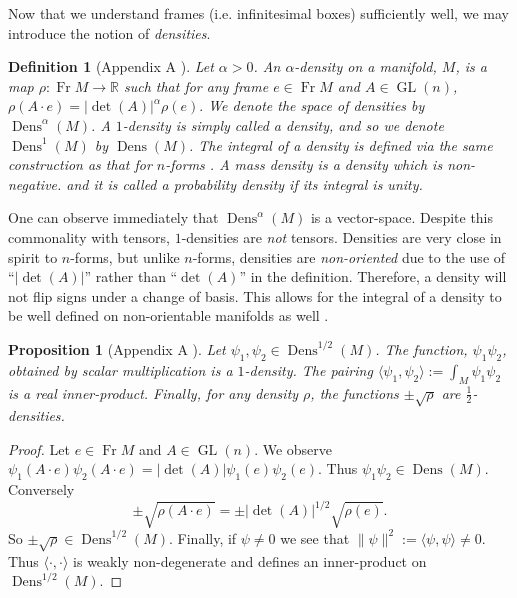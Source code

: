 \documentclass[a4paper, 12 pt]{amsart}
\newcommand{\R}{\mathbb{R}}
\newtheorem{defn}[thm]{Definition}
\newtheorem{prop}[thm]{Proposition}
\DeclareMathOperator{\Fr}{Fr}
\DeclareMathOperator{\GL}{GL}
\DeclareMathOperator{\Dens}{Dens}
\begin{document}
  Now that we understand frames (i.e. infinitesimal boxes)
  sufficiently well, we may introduce the notion of \emph{densities}.

  \begin{defn}[Appendix A \cite{BatesWeinstein1997}]
    \label{eq:density}
    Let $\alpha > 0$.
    An $\alpha$-\emph{density} on a manifold, $M$, is a map
    $\rho:\Fr M \to \R$ such that
    for any frame $e \in \Fr M$ and $A \in \GL(n)$,
    $
      \rho( A \cdot e ) =  | \det(A) |^\alpha \rho(e).
    $
    We denote the space of densities by $\Dens^\alpha(M)$.
    A $1$-density is simply called a \emph{density}, and
    so we denote $\Dens^1(M)$ by $\Dens(M)$.
    The integral of a density is defined via the same construction as that
    for $n$-forms \cite[Ch. 14]{Lee2006}.
    A \emph{mass density} is a density which is non-negative.
    and it is called a \emph{probability density} if its integral is
    unity.
  \end{defn}

  One can observe immediately that $\Dens^\alpha(M)$ is a vector-space.
  Despite this commonality with tensors,
  $1$-densities are \emph{not} tensors.
  Densities are very close in spirit to $n$-forms,
  but unlike $n$-forms, densities are \emph{non-oriented}
  due to the use of ``$|\det(A)|$'' rather than ``$\det(A)$'' 
  in the definition.
  Therefore, a density will not flip signs under a change of basis.
  This allows for the integral of a density to be well defined
  on non-orientable manifolds as well \cite[Ch. 14]{Lee2006}.

  \begin{prop}[Appendix A \cite{BatesWeinstein1997}]
    Let $\psi_1,\psi_2 \in \Dens^{1/2}(M)$.
    The function, $\psi_1 \psi_2$, obtained by
    scalar multiplication is a $1$-density.
    The pairing
    $
    \langle \psi_1, \psi_2 \rangle := \int_M \psi_1 \psi_2 
    $
    is a real inner-product.
    Finally, for any density $\rho$, the functions $\pm\sqrt{\rho}$ are
    $\frac{1}{2}$-densities.
  \end{prop}
  \begin{proof}
    Let $e \in \Fr M$ and $A \in \GL(n)$.
    We observe $\psi_1(A \cdot e) \psi_2(A \cdot e) = |\det(A) | \psi_1(e) \psi_2(e)$.  Thus $\psi_1 \psi_2 \in \Dens(M)$.
    Conversely $$\pm \sqrt{\rho( A \cdot e)} = \pm | \det(A) |^{1/2} \sqrt{ \rho(e)}.$$ So $\pm \sqrt{\rho} \in \Dens^{1/2}(M)$.
    Finally, if $\psi \neq 0$ we see that $\| \psi \|^2 := \langle \psi , \psi \rangle \neq 0$.
    Thus $\langle \cdot , \cdot \rangle$ is weakly non-degenerate
    and defines an inner-product on $\Dens^{1/2}(M)$.
  \end{proof}
\end{document}
